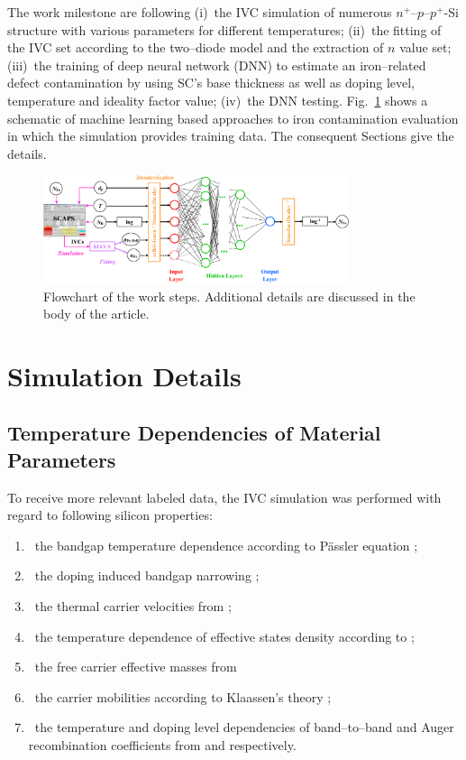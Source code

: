 \documentclass[journal]{IEEEtran}
\begin{document}
The work milestone are following
(i)~the IVC simulation of numerous $n^+$--$p$--$p^+$-Si structure with various parameters for different temperatures;
(ii)~the fitting of the IVC set according to the two--diode model and the extraction of $n$ value set;
(iii)~the training of deep neural network (DNN) to estimate an iron--related defect contamination  by using SC's base thickness as well as doping level,
temperature and ideality factor value;
(iv)~the DNN testing.
Fig.~\ref{fig_chem} shows a schematic of machine learning based approaches to iron contamination evaluation in which the simulation provides training data.
The consequent Sections give the details.

\begin{figure}[tb]
\centering
\includegraphics[width=0.8\textwidth]{Chem}
\caption{Flowchart of the work  steps.
Additional details are discussed in the body of the article.}
\label{fig_chem}
\end{figure}


\section{Simulation Details}

\subsection{Temperature Dependencies of Material Parameters}

To receive more relevant labeled data, the IVC simulation was performed with regard to following silicon properties:
\begin{enumerate}
  \item~the bandgap temperature dependence according to P\"assler equation \cite{Pasler};
  \item~the doping induced bandgap narrowing \cite{EgNarrow};
  \item~the thermal carrier velocities from \cite{Nc:Green};
  \item~the temperature dependence of effective states density  according to \cite{Si_ni_Couderc};
  \item~the free carrier effective masses from \cite{OMara}
  \item~the carrier mobilities according to Klaassen's theory  \cite{KLAASSEN953};
  \item~the temperature and doping level dependencies of band--to--band and Auger recombination coefficients from \cite{Si_BtB} and \cite{Si_Auger} respectively.
\end{enumerate}
\end{document}
